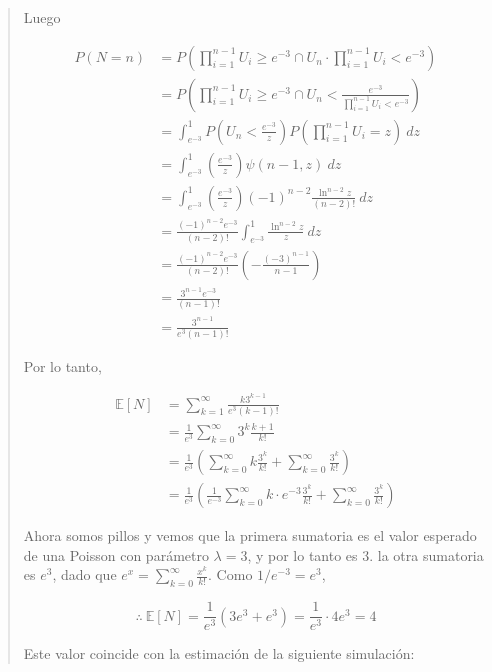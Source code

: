 \documentclass[a4paper, 12pt]{article}
\begin{document}
\begin{quote}
Luego 


\begin{align*}
  P(N = n) 
  &= P \left( \prod_{i=1}^{n-1} U_i \geq e^{-3} \cap U_n \cdot \prod_{i=1}^{n-1}
  U_i < e^{-3}\right) \\ 
  &= P \left( \prod_{i=1}^{n-1} U_i \geq e^{-3} \cap U_n  < \frac{e^{-3}}{\prod_{i=1}^{n-1}U_i < e^{-3}}
    \right) \\ 
  &= \int_{e^{-3}}^1 P(U_n < \frac{e^{-3}}{z}) P\left( \prod_{i=1}^{n-1} U_i
  = z \right) ~ dz \\ 
  &=\int_{e^{-3}}^1 \left( \frac{e^{-3}}{z} \right) \psi(n-1, z) ~ dz \\ 
  &=\int_{e^{-3}}^1 \left( \frac{e^{-3}}{z} \right) (-1)^{n-2} 
  \frac{\ln^{n-2} z}{(n-2)!} ~ dz \\ 
  &= \frac{ (-1)^{n-2}e^{-3} }{(n-2)!}\int_{e^{-3}}^1
  \frac{ \ln^{n-2} z }{z} ~ dz \\ 
  &= \frac{ (-1)^{n-2}e^{-3} }{(n-2)!} \left( - \frac{(-3)^{n-1}}{n-1} \right)
  \\ 
  &= \frac{3^{n-1}e^{-3}}{(n-1)!} \\ 
  &= \frac{3^{n-1}}{e^3(n-1)!}
\end{align*}

Por lo tanto, 

\begin{align*}
  \mathbb{E}\left[ N \right] 
  &= \sum_{k=1}^\infty \frac{k 3^{k-1}}{e^{3}(k-1)!}\\
  &=\frac{1}{e^3} \sum_{k=0}^\infty 3^{k} \frac{k+1}{k!} \\
  &=\frac{1}{e^3}\left(\sum_{k=0}^\infty k \frac{3^k}{k!} + \sum_{k=0}^\infty
  \frac{3^k}{k!} \right) \\ 
  &=\frac{1}{e^3}\left(\frac{1}{e^{-3}}\sum_{k=0}^\infty k \cdot e^{-3} \frac{3^k}{k!} + \sum_{k=0}^\infty
  \frac{3^k}{k!} \right)
\end{align*}

Ahora somos pillos y vemos que la primera sumatoria es el valor
esperado de una Poisson con parámetro $\lambda = 3$, y por lo tanto es 
$3$. la otra sumatoria es $e^3$, dado que $e^x = \sum_{k=0}^\infty
\frac{x^k}{k!}$. Como $1 / e^{-3} = e^3$,

\begin{equation*}
  \therefore ~ \mathbb{E}\left[ N \right] = \frac{1}{e^3}(3e^3 + e^3) =
  \frac{1}{e^3} \cdot 4e^3 = 4
\end{equation*}

Este valor coincide con la estimación de la siguiente simulación:


\end{quote}
\end{document}
